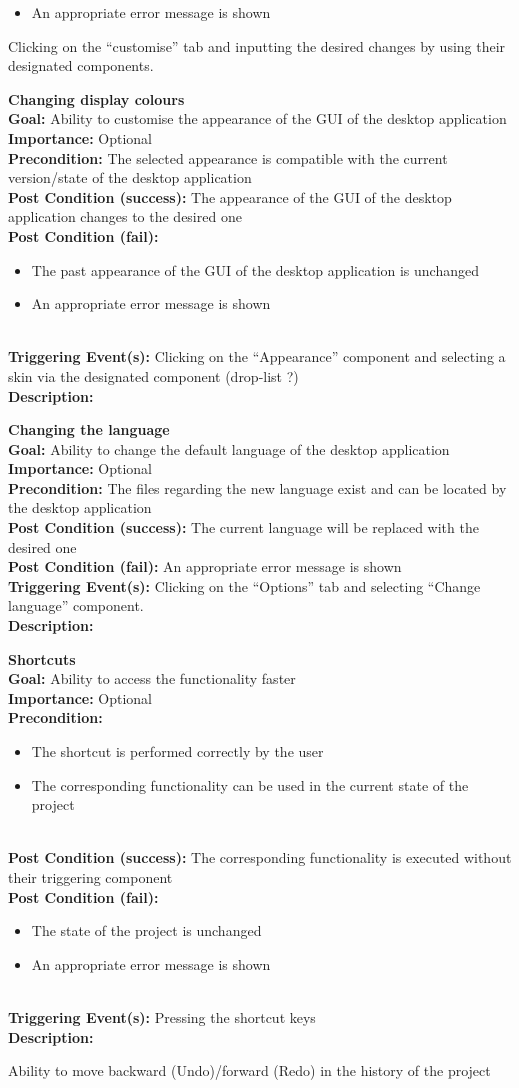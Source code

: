 \documentclass[10pt,a4paper]{report}
\newcommand{\precondition}[1]{
    \textbf{Precondition: } #1 \leavevmode \\
}
\newcommand{\FRODescription}[8]{
    \textbf{#1} \leavevmode \\
    \textbf{Goal: } #2 \leavevmode \\
    \textbf{Importance: } #3 \leavevmode \\
    \precondition{#4}
    \textbf{Post Condition (success): } #5 \leavevmode \\
    \textbf{Post Condition (fail): } #6 \leavevmode \\
    \textbf{Triggering Event(s): } #7 \leavevmode \\
    \textbf{Description: } \leavevmode \\
    #8}
\begin{document}
\begin{FRO}
{\begin{itemize}
        \item An appropriate error message is shown
    \end{itemize}}
    {Clicking on the “customise” tab and inputting the desired changes by using their designated components.}
    \item \FRODescription{Changing display colours}
    {Ability to customise the appearance of the GUI of the desktop application}
    {Optional}
    {The selected appearance is compatible with the current version/state of the desktop application}
    {The appearance of the GUI of the desktop application changes to the desired one}
    {\begin{itemize}
        \item The past appearance of the GUI of the desktop application is unchanged
        \item An appropriate error message is shown
    \end{itemize}}
    {Clicking on the “Appearance” component and selecting a skin via the designated component (drop-list ?)}
    \item \FRODescription{Changing the language}
    {Ability to change the default language of the desktop application}
    {Optional}
    {The files regarding the new language exist and can be located by the desktop application}
    {The current language will be replaced with the desired one}
    {An appropriate error message is shown}
    {Clicking on the “Options” tab and selecting “Change language” component.}
    \item \FRODescription{Shortcuts}
    {Ability to access the functionality faster}
    {Optional}
    {\begin{itemize}
        \item The shortcut is performed correctly by the user
        \item The corresponding functionality can be used in the current state of the project
    \end{itemize}}
    {The corresponding functionality is executed without their triggering component}
    {\begin{itemize}
        \item The state of the project is unchanged
        \item An appropriate error message is shown
    \end{itemize}}
    {Pressing the shortcut keys}
    \item {}
    {Ability to move backward (Undo)/forward (Redo) in the history of the project}

\end{FRO}
\end{document}
